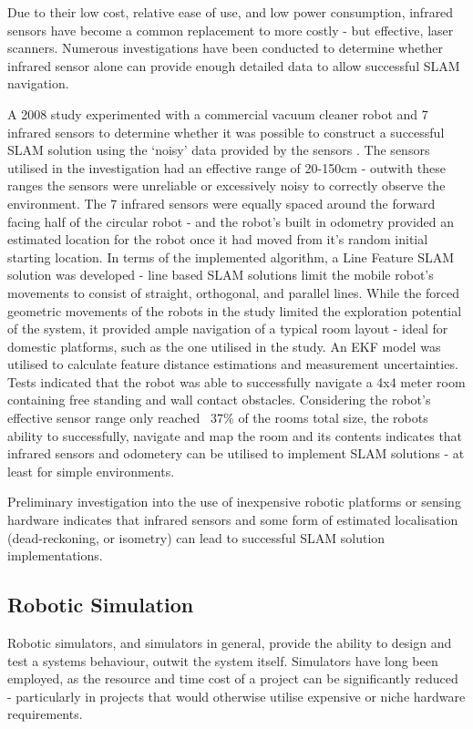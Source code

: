 Due to their low cost, relative ease of use, and low power consumption,
infrared sensors have become a common replacement to more costly - but
effective, laser scanners.
Numerous investigations have been conducted to determine whether infrared
sensor alone can provide enough detailed data to allow successful SLAM
navigation.

A 2008 study experimented with a commercial vacuum cleaner robot and 7 infrared
sensors to determine whether it was possible to construct a successful SLAM
solution using the `noisy' data provided by the sensors \cite{Choi2008}.
The sensors utilised in the investigation had an effective range of 20-150cm -
outwith these ranges the sensors were unreliable or excessively noisy to
correctly observe the environment.
The 7 infrared sensors were equally spaced around the forward facing half of
the circular robot - and the robot's built in odometry provided an estimated
location for the robot once it had moved from it's random initial starting
location.
In terms of the implemented algorithm, a  Line Feature SLAM solution was
developed - line based SLAM solutions limit the mobile robot's movements to
consist of straight, orthogonal, and parallel lines.
While the forced geometric movements of the robots in the study limited the
exploration potential of the system, it provided ample navigation of a typical
room layout - ideal for domestic platforms, such as the one utilised in the
study.
An EKF model was utilised to calculate feature distance estimations and
measurement uncertainties.
Tests indicated that the  robot was able to successfully navigate a 4x4 meter
room containing free standing and wall contact obstacles.
Considering the robot's effective sensor range only reached ~37\% of the rooms
total size, the robots ability to successfully, navigate and map the room and
its contents indicates that infrared sensors and odometery can be utilised to
implement SLAM solutions - at least for simple environments.

Preliminary investigation into the use of inexpensive robotic platforms or
sensing hardware indicates that infrared sensors and some form of estimated
localisation (dead-reckoning, or isometry) can lead to successful SLAM solution
implementations.


\subsection{Robotic Simulation} \label{sec_sim}
Robotic simulators, and simulators in general, provide the ability to design
and test a  systems behaviour, outwit the system itself. 
Simulators have long been employed, as the resource and time cost of a project
can be significantly reduced - particularly in projects that would otherwise
utilise expensive or niche hardware requirements.


